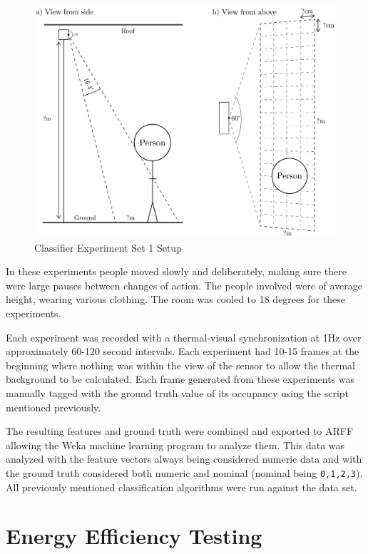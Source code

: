 \documentclass[../thesis/thesis.tex]{subfiles}
\begin{document}
\begin{landscape}
 \begin{figure}
 \centering
 \includegraphics[height=\textheight]{../diagrams/third-exp-setup2.pdf}
 \caption{Classifier Experiment Set 1 Setup}
 \label{fig:exps:3setup}
 \end{figure}
\end{landscape}

In these experiments people moved slowly and deliberately, making sure there were large pauses between changes of action. The people involved were of average height, wearing various clothing. The room was cooled to 18 degrees for these experiments.

Each experiment was recorded with a thermal-visual synchronization at 1Hz over approximately 60-120 second intervals. Each experiment had 10-15 frames at the beginning where nothing was within the view of the sensor to allow the thermal background to be calculated. Each frame generated from these experiments was manually tagged with the ground truth value of its occupancy using the script mentioned previously.

The resulting features and ground truth were combined and exported to ARFF allowing the Weka machine learning program to analyze them. This data was analyzed with the feature vectors always being considered numeric data and with the ground truth considered both numeric and nominal (nominal being \texttt{{0,1,2,3}}). All previously mentioned classification algorithms were run against the data set.

\section{Energy Efficiency Testing}


\end{document}
